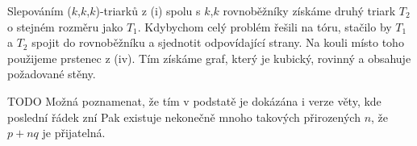 Slepováním ($k$,$k$,$k$)-triarků z (i) spolu s $k$,$k$ rovnoběžníky získáme druhý triark $T_2$ o stejném rozměru jako $T_1$. Kdybychom celý problém řešili na tóru, stačilo by $T_1$ a $T_2$ spojit do rovnoběžníku a sjednotit odpovídající strany. Na kouli místo toho použijeme prstenec z (iv). Tím získáme graf, který je kubický, rovinný a obsahuje požadované stěny.

TODO Možná poznamenat, že tím v podstatě je dokázána i verze věty, kde poslední řádek zní Pak existuje nekonečně mnoho takových přirozených $n$, že $p+nq$ je přijatelná.